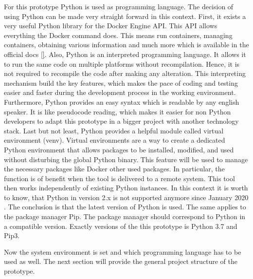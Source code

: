 For this prototype Python is used as programming language. The decision of using Python can be made very straight forward in this context. First, it exists a very useful Python library for the Docker Engine API. This API allows everything the Docker command does. This means run containers, managing containers, obtaining various information and much more which is available in the official docs \ref{}. Also, Python is an interpreted programming language. It allows it to run the same code on multiple platforms without recompilation. Hence, it is not required to recompile the code after making any alteration. This interpreting mechanism build the key features, which makes the pace of coding and testing easier and faster during the development process in the working environment. 
Furthermore, Python provides an easy syntax which is readable by any english speaker. It is like pseudocode reading, which makes it easier for non Python developers to adapt this prototype in a bigger project with another technology stack. Last but not least, Python provides a helpful module called virtual environment (venv). Virtual environments are a way to create a dedicated Python environment that allows packages to be installed, modified, and used without disturbing the global Python binary. This feature will be used to manage the necessary packages like Docker other used packages. In particular, the function is of benefit when the tool is delivered to a remote system. This tool then works independently of existing Python instances. In this context it is worth to know, that Python in version 2.x is not supported anymore since January 2020 \cite{Python_deprecated}. The conclusion is that the latest version of Python is used. The same applies to the package manager Pip. The package manager should correspond to Python in a compatible version. 
Exactly versions of the this prototype is Python 3.7 and Pip3.

Now the system environment is set and which programming language has to be used as well. The next section will provide the general project structure of the prototype.
